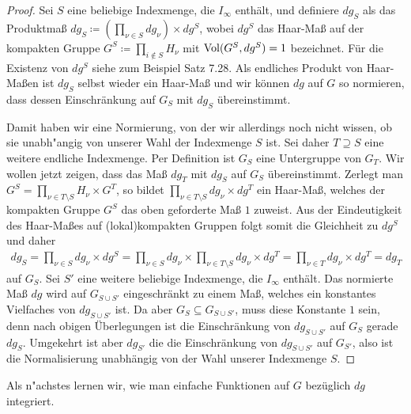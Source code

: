 		\begin{proof}
			Sei $S$ eine beliebige Indexmenge,  die $I_\infty$ enthält, und definiere $dg_S$ als das Produktmaß $dg_S \coloneqq \left(\prod_{\nu \in S}dg_\nu\right) \times dg^S$, wobei $dg^S$ das Haar-Maß auf der kompakten Gruppe $G^S\coloneqq \prod_{i \notin S} H_\nu$ mit $\operatorname{Vol}(G^S, dg^S) = 1$ bezeichnet. 
			Für die Existenz von $dg^S$ siehe zum Beispiel \textcite{folland} Satz 7.28. 
			Als endliches Produkt von Haar-Maßen ist $dg_S$ selbst wieder ein Haar-Maß und wir können $dg$ auf $G$ so normieren, dass dessen Einschränkung auf $G_S$ mit $dg_S$ übereinstimmt.
			
			Damit haben wir eine Normierung, von der wir allerdings noch nicht wissen, ob sie unabh"angig von unserer Wahl der Indexmenge $S$ ist.
			Sei daher $T\supseteq S$ eine weitere endliche Indexmenge. 
			Per Definition ist $G_S$ eine Untergruppe von $G_T$. 
			Wir wollen jetzt zeigen, dass das Maß $dg_T$ mit $dg_S$ auf $G_S$ übereinstimmt.
			Zerlegt man $G^S = \prod_{\nu\in T \setminus S} H_\nu \times G^T$, so bildet $\prod_{\nu\in T \setminus S} dg_\nu\times dg^T$ ein Haar-Maß, welches der kompakten Gruppe $G^S$ das oben geforderte Maß $1$ zuweist.
			Aus der Eindeutigkeit des Haar-Maßes auf (lokal)kompakten Gruppen folgt somit die Gleichheit zu $dg^S$ und daher
			\begin{align*}
				dg_S 
					= \prod_{\nu \in S}dg_\nu \times dg^S 
					= \prod_{\nu \in S}dg_\nu \times \prod_{\nu\in T \setminus S} dg_\nu \times dg^T
					= \prod_{\nu \in T}dg_\nu \times dg^T = dg_T
			\end{align*}
			auf $G_S$. 
			Sei $S'$ eine weitere beliebige Indexmenge, die $I_\infty$ enthält. 
			Das normierte Maß $dg$ wird auf $G_{S\cup S'}$ eingeschränkt zu einem Maß, welches ein konstantes Vielfaches von $dg_{S\cup S'}$ ist. 
			Da aber $G_S \subseteq G_{S\cup S'}$, muss diese Konstante $1$ sein, denn nach obigen Überlegungen ist die Einschränkung von $dg_{S\cup S'}$ auf $G_S$ gerade $dg_{S}$.
			Umgekehrt ist aber $dg_{S'}$ die die Einschränkung von $dg_{S\cup S'}$ auf $G_{S'}$, also ist die Normalisierung unabhängig von der Wahl unserer Indexmenge $S$.
		\end{proof}
		Als n"achstes lernen wir, wie man einfache Funktionen auf $G$ bezüglich $dg$ integriert.
